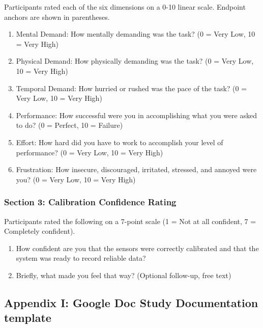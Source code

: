 \documentclass[
]{article}
\begin{document}
Participants rated each of the six dimensions on a 0-10 linear scale. Endpoint anchors are shown in parentheses.

\begin{enumerate}
\def\labelenumi{\arabic{enumi}.}
\item
  Mental Demand: How mentally demanding was the task? (0 = Very Low, 10 = Very High)
\item
  Physical Demand: How physically demanding was the task? (0 = Very Low, 10 = Very High)
\item
  Temporal Demand: How hurried or rushed was the pace of the task? (0 = Very Low, 10 = Very High)
\item
  Performance: How successful were you in accomplishing what you were asked to do? (0 = Perfect, 10 = Failure)
\item
  Effort: How hard did you have to work to accomplish your level of performance? (0 = Very Low, 10 = Very High)
\item
  Frustration: How insecure, discouraged, irritated, stressed, and annoyed were you? (0 = Very Low, 10 = Very High)
\end{enumerate}

\hypertarget{section-3-calibration-confidence-rating}{%
\subsubsection{Section 3: Calibration Confidence Rating}\label{section-3-calibration-confidence-rating}}

Participants rated the following on a 7-point scale (1 = Not at all confident, 7 = Completely confident).

\begin{enumerate}
\def\labelenumi{\arabic{enumi}.}
\item
  How confident are you that the sensors were correctly calibrated and that the system was ready to record reliable data?
\item
  Briefly, what made you feel that way? (Optional follow-up, free text)
\end{enumerate}

\clearpage
\hypertarget{appendix-m}{%
\subsection{Appendix I: Google Doc Study Documentation template}\label{appendix-m}}


\end{document}
